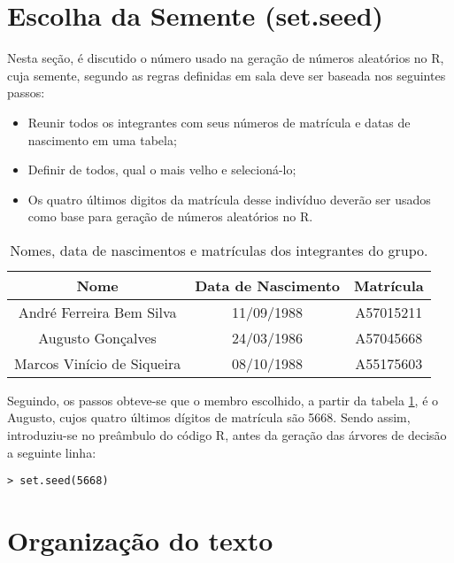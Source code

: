 \section{Escolha da Semente (set.seed)}

Nesta seção, é discutido o número usado na geração de números aleatórios no R, cuja semente, segundo as regras definidas em sala deve ser baseada nos seguintes passos:

\begin{itemize}
  \item Reunir todos os integrantes com seus números de matrícula e datas
    de nascimento em uma tabela;
  \item Definir de todos, qual o mais velho e selecioná-lo;
  \item Os quatro últimos digitos da matrícula desse indivíduo deverão ser
    usados como base para geração de números aleatórios no R.
\end{itemize}

\begin{table}[h]
  \begin{centering}
    \begin{tabular}{c|c|c}
      \hline 
      Nome & Data de Nascimento & Matrícula\tabularnewline
      \hline 
      André Ferreira Bem Silva & 11/09/1988 & A57015211\tabularnewline
      \hline 
      Augusto Gonçalves & 24/03/1986 & A57045668\tabularnewline
      \hline 
      Marcos Vinício de Siqueira & 08/10/1988 & A55175603\tabularnewline
      \hline 
    \end{tabular}
  \par\end{centering}

  \caption{\label{tab:Integrantes}Nomes, data de nascimentos e matrículas dos integrantes do grupo.}
\end{table}

Seguindo, os passos obteve-se que o membro escolhido, a partir da tabela \ref{tab:Integrantes}, é o Augusto, cujos quatro últimos dígitos de matrícula são 5668. Sendo assim, introduziu-se no preâmbulo do código R, antes da geração das árvores de decisão a seguinte linha:
\begin{verbatim}
> set.seed(5668)
\end{verbatim}

\section{Organização do texto}

